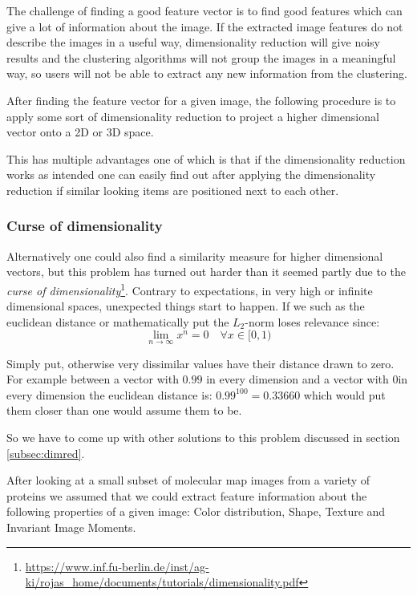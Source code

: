 \documentclass[journal]{vgtc}       %
\begin{document}
The challenge of finding a good feature vector is to find good features which can give a lot of information about the image.
If the extracted image features do not describe the images in a useful way, dimensionality reduction will give noisy results and the clustering algorithms will not group the images in a meaningful way, so users will not be able to extract any new information from the clustering.

After finding the feature vector for a given image, the following procedure is to apply some sort of dimensionality reduction to project a higher dimensional vector onto a 2D or 3D space.

This has multiple advantages one of which is that if the dimensionality reduction works as intended one can easily find out after applying the dimensionality reduction if similar looking items are positioned next to each other.

\subsubsection{Curse of dimensionality}

Alternatively one could also find a similarity measure for higher dimensional vectors, but this problem has turned out harder than it seemed partly due to the \textit{curse of dimensionality}\mbox{\footnote{\url{https://www.inf.fu-berlin.de/inst/ag-ki/rojas_home/documents/tutorials/dimensionality.pdf}}}.
Contrary to expectations, in very high or infinite dimensional spaces, unexpected things start to happen. If we  such as the euclidean distance or mathematically put the \(L_2\)-norm loses relevance since:
\begin{equation}
\lim_{n\rightarrow \infty} x^n = 0 \quad \forall x \in [0,1)
\end{equation}

Simply put, otherwise very dissimilar values have their distance drawn to zero. For example between a vector with \(0.99\) in every dimension and a vector with \(0\)in every dimension the euclidean distance is: \(0.99^{100} = 0.33660\) which would put them closer than one would assume them to be.

So we have to come up with other solutions to this problem discussed in section \ref{subsec:dimred}. %

After looking at a small subset of molecular map images from a variety of proteins we assumed that we could  extract feature information about the following properties of a given image: 
Color distribution,   Shape,   Texture  and  Invariant  Image Moments.
\end{document}
